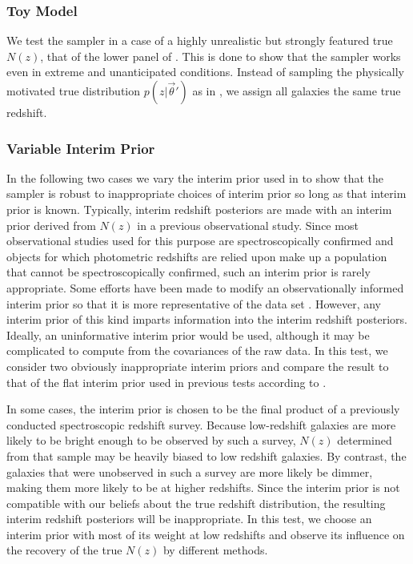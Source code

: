 \subsubsection{Toy Model}

We test the sampler in a case of a highly unrealistic but strongly featured true $N(z)$, that of the lower panel of .  
This is done to show that the sampler works even in extreme and unanticipated conditions.  
Instead of sampling the physically motivated true distribution $p(z|\vec{\theta}')$ as in , we assign all galaxies the same true redshift.  

\subsubsection{Variable Interim Prior}

In the following two cases we vary the interim prior used in  to show that the sampler is robust to inappropriate choices of interim prior so long as that interim prior is known.  
Typically, interim redshift posteriors are made with an interim prior derived from $N(z)$ in a previous observational study.  
Since most observational studies used for this purpose are spectroscopically confirmed and objects for which photometric redshifts are relied upon make up a population that cannot be spectroscopically confirmed, such an interim prior is rarely appropriate.  
Some efforts have been made to modify an observationally informed interim prior so that it is more representative of the data set \citep{Sheldon2012}.  
However, any interim prior of this kind imparts information into the interim redshift posteriors.  
Ideally, an uninformative interim prior would be used, although it may be complicated to compute from the covariances of the raw data.  
In this test, we consider two obviously inappropriate interim priors and compare the result to that of the flat interim prior used in previous tests according to .

In some cases, the interim prior is chosen to be the final product of a previously conducted spectroscopic redshift survey.  
Because low-redshift galaxies are more likely to be bright enough to be observed by such a survey, $N(z)$ determined from that sample may be heavily biased to low redshift galaxies.  
By contrast, the galaxies that were unobserved in such a survey are more likely be dimmer, making them more likely to be at higher redshifts.  
Since the interim prior is not compatible with our beliefs about the true redshift distribution, the resulting interim redshift posteriors will be inappropriate.  
In this test, we choose an interim prior with most of its weight at low redshifts and observe its influence on the recovery of the true $N(z)$ by different methods.  


